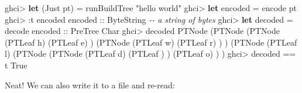 \documentclass[]{article}
\newenvironment{Shaded}{}{}
\newcommand{\CharTok}[1]{\textcolor[rgb]{0.25,0.44,0.63}{#1}}
\newcommand{\CommentTok}[1]{\textcolor[rgb]{0.38,0.63,0.69}{\textit{#1}}}
\newcommand{\DataTypeTok}[1]{\textcolor[rgb]{0.56,0.13,0.00}{#1}}
\newcommand{\KeywordTok}[1]{\textcolor[rgb]{0.00,0.44,0.13}{\textbf{#1}}}
\newcommand{\NormalTok}[1]{#1}
\newcommand{\OperatorTok}[1]{\textcolor[rgb]{0.40,0.40,0.40}{#1}}
\newcommand{\OtherTok}[1]{\textcolor[rgb]{0.00,0.44,0.13}{#1}}
\newcommand{\StringTok}[1]{\textcolor[rgb]{0.25,0.44,0.63}{#1}}
\begin{document}
\begin{Shaded}
\begin{Highlighting}[]
\NormalTok{ghci}\OperatorTok{>} \KeywordTok{let}\NormalTok{ (}\DataTypeTok{Just}\NormalTok{ pt) }\OtherTok{=}\NormalTok{ runBuildTree }\StringTok{"hello world"}
\NormalTok{ghci}\OperatorTok{>} \KeywordTok{let}\NormalTok{ encoded }\OtherTok{=}\NormalTok{ encode pt}
\NormalTok{ghci}\OperatorTok{>} \OperatorTok{:}\NormalTok{t encoded}
\OtherTok{encoded ::} \DataTypeTok{ByteString}       \CommentTok{{-}{-} a string of bytes}
\NormalTok{ghci}\OperatorTok{>} \KeywordTok{let}\NormalTok{ decoded }\OtherTok{=}\NormalTok{ decode}\OtherTok{ encoded ::} \DataTypeTok{PreTree} \DataTypeTok{Char}
\NormalTok{ghci}\OperatorTok{>}\NormalTok{ decoded}
\DataTypeTok{PTNode}\NormalTok{ (}\DataTypeTok{PTNode}\NormalTok{ (}\DataTypeTok{PTNode}\NormalTok{ (}\DataTypeTok{PTLeaf} \CharTok{\textquotesingle{}h\textquotesingle{}}\NormalTok{)}
\NormalTok{                       (}\DataTypeTok{PTLeaf} \CharTok{\textquotesingle{}e\textquotesingle{}}\NormalTok{)}
\NormalTok{               )}
\NormalTok{               (}\DataTypeTok{PTNode}\NormalTok{ (}\DataTypeTok{PTLeaf} \CharTok{\textquotesingle{}w\textquotesingle{}}\NormalTok{)}
\NormalTok{                       (}\DataTypeTok{PTLeaf} \CharTok{\textquotesingle{}r\textquotesingle{}}\NormalTok{)}
\NormalTok{               )}
\NormalTok{       )}
\NormalTok{       (}\DataTypeTok{PTNode}\NormalTok{ (}\DataTypeTok{PTLeaf} \CharTok{\textquotesingle{}l\textquotesingle{}}\NormalTok{)}
\NormalTok{               (}\DataTypeTok{PTNode}\NormalTok{ (}\DataTypeTok{PTNode}\NormalTok{ (}\DataTypeTok{PTLeaf} \CharTok{\textquotesingle{}d\textquotesingle{}}\NormalTok{)}
\NormalTok{                               (}\DataTypeTok{PTLeaf} \CharTok{\textquotesingle{} \textquotesingle{}}\NormalTok{)}
\NormalTok{                       )}
\NormalTok{                       (}\DataTypeTok{PTLeaf} \CharTok{\textquotesingle{}o\textquotesingle{}}\NormalTok{)}
\NormalTok{               )}
\NormalTok{       )}
\NormalTok{ghci}\OperatorTok{>}\NormalTok{ decoded }\OperatorTok{==}\NormalTok{ t}
\DataTypeTok{True}
\end{Highlighting}
\end{Shaded}

Neat! We can also write it to a file and re-read:
\end{document}
